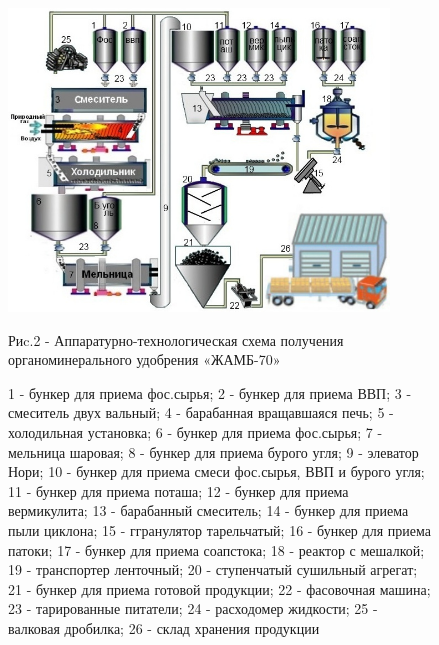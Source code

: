\begin{figure}[H]
	\centering
	\includegraphics[width=0.9\textwidth]{assets/1081}
	\caption*{Риc.2 - Аппаратурно-технологическая схема получения органоминерального удобрения «ЖАМБ-70»}
	\caption*{1 - бункер для приема фос.сырья; 2 - бункер для приема ВВП; 3 -
смеситель двух вальный; 4 - барабанная вращавшаяся печь; 5 - холодильная
установка; 6 - бункер для приема фос.сырья; 7 - мельница шаровая; 8 -
бункер для приема бурого угля; 9 - элеватор Нори; 10 - бункер для приема
смеси фос.сырья, ВВП и бурого угля; 11 - бункер для приема поташа; 12 -
бункер для приема вермикулита; 13 - барабанный смеситель; 14 - бункер
для приема пыли циклона; 15 - ггранулятор тарельчатый; 16 - бункер для
приема патоки; 17 - бункер для приема соапстока; 18 - реактор с
мешалкой; 19 - транспортер ленточный; 20 - ступенчатый сушильный
агрегат; 21 - бункер для приема готовой продукции; 22 - фасовочная
машина; 23 - тарированные питатели; 24 - расходомер жидкости; 25 -
валковая дробилка; 26 - склад хранения продукции}
\end{figure}

